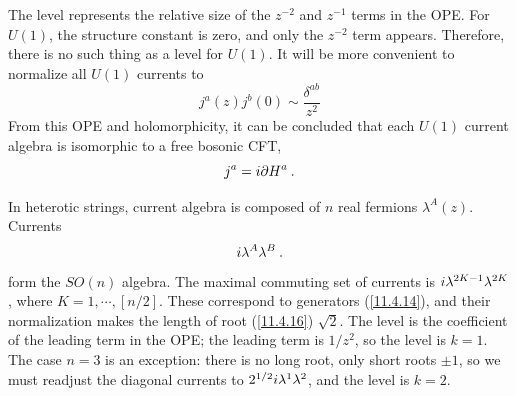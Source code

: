 The level represents the relative size of the $z^{-2}$ and $z^{-1}$ terms in the OPE. For $U(1)$, the structure constant is zero, and only the $z^{-2}$ term appears. Therefore, there is no such thing as a level for $U(1)$. It will be more convenient to normalize all $U(1)$ currents to
\begin{equation}
	j^{a}(z)j^{b}(0) \sim \frac{\delta^{ab}}{z^{2}} \label{11.5.14}
\end{equation}
From this OPE and holomorphicity, it can be concluded that each $U(1)$ current algebra is isomorphic to a free bosonic CFT,
\begin{equation}
	j^{a}=i\partial H^{a} \:. \label{11.5.15}
\end{equation}

In heterotic strings, current algebra is composed of $n$ real fermions $\lambda^{A}(z)$. Currents
\begin{equation}
	i\lambda^{A}\lambda^{B} \:. \label{11.5.16}
\end{equation}
form the $SO(n)$ algebra. The maximal commuting set of currents is $i\lambda^{2K-1}\lambda^{2K}$, where $K=1,\cdots,[n/2]$. These correspond to generators (\ref{11.4.14}), and their normalization makes the length of root (\ref{11.4.16}) $\sqrt{2}$. The level is the coefficient of the leading term in the OPE; the leading term is $1/z^{2}$, so the level is $k=1$. The case $n=3$ is an exception: there is no long root, only short roots $\pm1$, so we must readjust the diagonal currents to $2^{1/2}i\lambda^{1}\lambda^{2}$, and the level is $k=2$.
